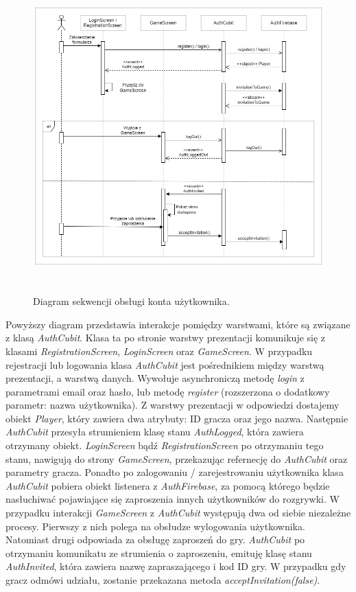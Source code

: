 \begin{figure}[h!]
	\begin{center}
		\includegraphics[width=16cm,height=12cm]{img/diagram-sekwencji-auth.png}
	\end{center}
	\caption{{\color{dgray}Diagram sekwencji obsługi konta użytkownika.}} 
	\label{AuthCubit}
\end{figure}

Powyższy diagram przedstawia interakcje pomiędzy warstwami, które są związane z klasą \emph{AuthCubit}. Klasa ta po stronie warstwy prezentacji komunikuje się z klasami \emph{RegistrationScreen}, \emph{LoginScreen} oraz \emph{GameScreen}. W przypadku rejestracji lub logowania klasa \emph{AuthCubit} jest pośrednikiem między warstwą prezentacji, a warstwą danych. Wywołuje asynchroniczą metodę \emph{login} z parametrami email oraz hasło, lub metodę \emph{register} (rozszerzona o dodatkowy parametr: nazwa użytkownika). Z warstwy prezentacji w odpowiedzi dostajemy obiekt \emph{Player}, który zawiera dwa atrybuty: ID gracza oraz jego nazwa. Następnie \emph{AuthCubit} przesyła strumieniem klasę stanu \emph{AuthLogged}, która zawiera otrzymany obiekt. \emph{LoginScreen} bądź \emph{RegistrationScreen} po otrzymaniu tego stanu, nawigują do strony \emph{GameScreen}, przekazując refernecję do \emph{AuthCubit} oraz parametry gracza. Ponadto po zalogowaniu / zarejestrowaniu użytkownika klasa \emph{AuthCubit} pobiera obiekt listenera z \emph{AuthFirebase}, za pomocą którego będzie nasłuchiwać pojawiające się zaproszenia innych użytkowników do rozgrywki. W przypadku interakcji \emph{GameScreen} z \emph{AuthCubit} występują dwa od siebie niezależne procesy. Pierwszy z nich polega na obsłudze wylogowania użytkownika. Natomiast drugi odpowiada za obsługę zaproszeń do gry. \emph{AuthCubit} po otrzymaniu komunikatu ze strumienia o zaproszeniu, emituję klasę stanu \emph{AuthInvited}, która zawiera nazwę zapraszającego i kod ID gry. W przypadku gdy gracz odmówi udziału, zostanie przekazana metoda \emph{acceptInvitation(false)}.

